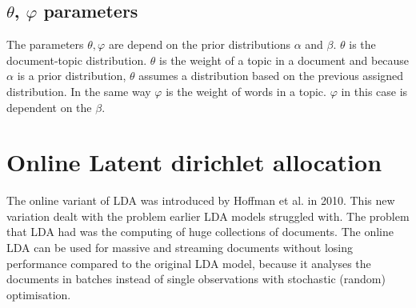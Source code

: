 \subsection{$\theta$, $\varphi$ parameters}\label{lda:thetavarphi}
The parameters $\theta, \varphi$ are depend on the prior distributions $\alpha$ and $\beta$. $\theta$ is the document-topic distribution. $\theta$ is the weight of a topic in a document and because $\alpha$ is a prior distribution, $\theta$ assumes a distribution based on the previous assigned distribution. 
In the same way $\varphi$ is the weight of words in a topic. $\varphi$ in this case is dependent on the $\beta$.

\section{Online Latent dirichlet allocation}
The online variant of LDA was introduced  by Hoffman et al. in 2010.\cite{Hoffman2010OnlineAllocation} This new variation dealt with the problem earlier LDA models struggled with. The problem that LDA had was the computing of huge collections of documents. The online LDA can be used for massive and streaming documents without losing performance compared to the original LDA model, because it analyses the documents in batches instead of single observations with stochastic (random) optimisation.\cite{Beaver2012StochasticInference} 


